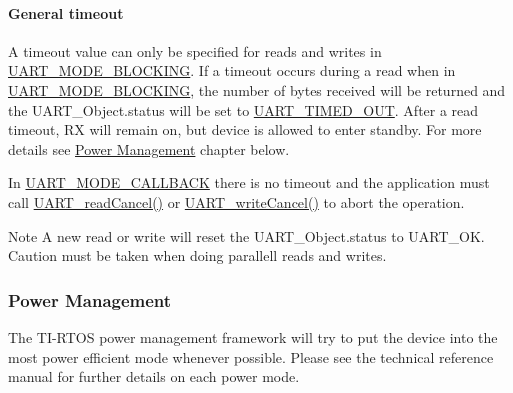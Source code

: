 \paragraph*{General timeout}

A timeout value can only be specified for reads and writes in \hyperlink{_u_a_r_t_8h_a2507a620dba95cd20885c52494d19e90ae6b6bd5d2d5df859ad6724e89e605ebf}{U\+A\+R\+T\+\_\+\+M\+O\+D\+E\+\_\+\+B\+L\+O\+C\+K\+I\+N\+G}. If a timeout occurs during a read when in \hyperlink{_u_a_r_t_8h_a2507a620dba95cd20885c52494d19e90ae6b6bd5d2d5df859ad6724e89e605ebf}{U\+A\+R\+T\+\_\+\+M\+O\+D\+E\+\_\+\+B\+L\+O\+C\+K\+I\+N\+G}, the number of bytes received will be returned and the U\+A\+R\+T\+\_\+\+Object.\+status will be set to \hyperlink{_u_a_r_t_c_c26_x_x_8h_a778bbef5f4b52a5651552136715f53c4aa965b1df388dcc5c87f1bb51120877c7}{U\+A\+R\+T\+\_\+\+T\+I\+M\+E\+D\+\_\+\+O\+U\+T}. After a read timeout, R\+X will remain on, but device is allowed to enter standby. For more details see \hyperlink{_u_a_r_t_c_c26_x_x_8h_POWER_MANAGEMENT}{Power Management} chapter below.

In \hyperlink{_u_a_r_t_8h_a2507a620dba95cd20885c52494d19e90ae0dbd9b5195e56c3c2aed10163523754}{U\+A\+R\+T\+\_\+\+M\+O\+D\+E\+\_\+\+C\+A\+L\+L\+B\+A\+C\+K} there is no timeout and the application must call \hyperlink{_u_a_r_t_8h_a51ed7e94d5b409ca1fcb2d65c5a25c3c}{U\+A\+R\+T\+\_\+read\+Cancel()} or \hyperlink{_u_a_r_t_8h_a0482cd0ab9ee7e802c8e785a5754d16d}{U\+A\+R\+T\+\_\+write\+Cancel()} to abort the operation.

\begin{DoxyNote}{Note}
A new read or write will reset the U\+A\+R\+T\+\_\+\+Object.\+status to U\+A\+R\+T\+\_\+\+O\+K. Caution must be taken when doing parallell reads and writes.
\end{DoxyNote}
\subsubsection*{Power Management\label{_u_a_r_t_c_c26_x_x_8h_POWER_MANAGEMENT}%
\hypertarget{_u_a_r_t_c_c26_x_x_8h_POWER_MANAGEMENT}{}%
}

The T\+I-\/\+R\+T\+O\+S power management framework will try to put the device into the most power efficient mode whenever possible. Please see the technical reference manual for further details on each power mode.

